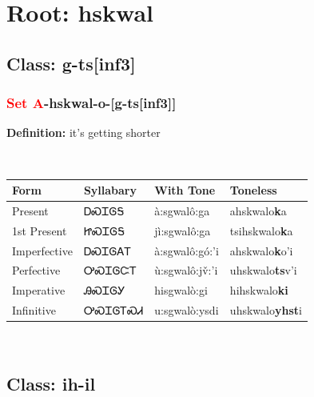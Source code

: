 \needspace{4in}
\section*{Root: hskwal}
\nopagebreak
{}
\needspace{3in}
\subsection*{Class: g-ts[inf3]}
\nopagebreak
\needspace{2in}
\subsubsection*{\textcolor{Red}{Set A}{-}\textbf{hskwal}{-}o{-}[g-ts[inf3]]}
\nopagebreak
\textbf{Definition: } it{\textquoteright}s getting shorter
\\[0.5em]
\begin{tabularx}{\textwidth}{l X X X}%
\toprule%
\textbf{Form}&\textbf{Syllabary}&\textbf{With Tone}&\textbf{Toneless}\\%
\midrule%
Present&ᎠᏍᏆᎶᎦ&à:sgwalô:ga&ahskwalo\textbf{k}a\\%
1st Present&ᏥᏍᏆᎶᎦ&jì:sgwalô:ga&tsihskwalo\textbf{k}a\\%
Imperfective&ᎠᏍᏆᎶᎪᎢ&à:sgwalô:gó:’i&ahskwalo\textbf{k}o'i\\%
Perfective&ᎤᏍᏆᎶᏨᎢ&ù:sgwalô:jv̌:’i&uhskwalo\textbf{ts}v'i\\%
Imperative&ᎯᏍᏆᎶᎩ&hisgwalò:gi&hihskwalo\textbf{ki}\\%
Infinitive&ᎤᏍᏆᎶᎢᏍᏗ&u:sgwalò:ysdi&uhskwalo\textbf{yhst}i\\%
\bottomrule%
\end{tabularx}
\\[1em]
\needspace{3in}
\subsection*{Class: ih-il}
\nopagebreak
\needspace{2in}
